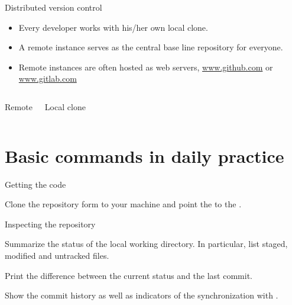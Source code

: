\begin{frame}{Distributed version control}
\begin{itemize}
\item Every developer works with his/her own local clone.
\item A remote instance serves as the central base line repository for everyone.
\item Remote instances are often hosted as web servers, {\eg} \url{www.github.com} or \url{www.gitlab.com}
\end{itemize}

\begin{columns}
\begin{block}{Remote}
\vspace{14em}
\end{block}
\begin{block}{Local clone}
\vspace{14em}
\end{block}
\end{columns}
\end{frame}

\section{Basic commands in daily practice}

\begin{frame}{Getting the code}
\begin{block}{}
Clone the repository form  to your machine and point the  to the .
\end{block}
\end{frame}

\begin{frame}{Inspecting the repository}
\begin{block}{}
Summarize the status of the local working directory. In particular, list staged, modified and untracked files.
\end{block}
\begin{block}{}
Print the difference between the current status and the last commit.
\end{block}
\begin{block}{}
Show the commit history as well as indicators of the synchronization with .
\end{block}
\end{frame}

